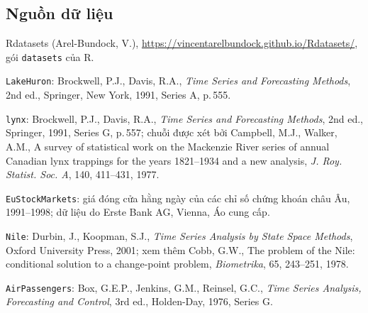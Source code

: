 \subsection*{Nguồn dữ liệu}
\begin{enumerate}[label={[DL\arabic*]},leftmargin=1.2cm]
\item \hypertarget{dl1}{}Rdatasets (Arel-Bundock, V.), \url{https://vincentarelbundock.github.io/Rdatasets/}, gói \texttt{datasets} của R.
\item \hypertarget{dl2}{}\texttt{LakeHuron}: Brockwell, P.J., Davis, R.A., \textit{Time Series and Forecasting Methods}, 2nd ed., Springer, New York, 1991, Series A, p.\,555.
\item \hypertarget{dl3}{}\texttt{lynx}: Brockwell, P.J., Davis, R.A., \textit{Time Series and Forecasting Methods}, 2nd ed., Springer, 1991, Series G, p.\,557; chuỗi được xét bởi Campbell, M.J., Walker, A.M., A survey of statistical work on the Mackenzie River series of annual Canadian lynx trappings for the years 1821--1934 and a new analysis, \textit{J. Roy. Statist. Soc. A}, 140, 411--431, 1977.
\item \hypertarget{dl4}{}\texttt{EuStockMarkets}: giá đóng cửa hằng ngày của các chỉ số chứng khoán châu Âu, 1991--1998; dữ liệu do Erste Bank AG, Vienna, Áo cung cấp.
\item \hypertarget{dl5}{}\texttt{Nile}: Durbin, J., Koopman, S.J., \textit{Time Series Analysis by State Space Methods}, Oxford University Press, 2001; xem thêm Cobb, G.W., The problem of the Nile: conditional solution to a change-point problem, \textit{Biometrika}, 65, 243--251, 1978.
\item \hypertarget{dl6}{}\texttt{AirPassengers}: Box, G.E.P., Jenkins, G.M., Reinsel, G.C., \textit{Time Series Analysis, Forecasting and Control}, 3rd ed., Holden-Day, 1976, Series G.
\end{enumerate}

